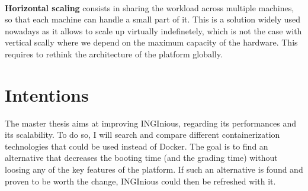 \paragraph{} \textbf{Horizontal scaling} consists in sharing the workload across multiple machines, so that each machine can handle a small part of it.  This is a solution widely used nowadays as it allows to scale up virtually indefinetely, which is not the case with vertical scally where we depend on the maximum capacity of the hardware.  This requires to rethink the architecture of the platform globally.

\section{Intentions}
The master thesis aims at improving INGInious, regarding its performances and its scalability.  To do so, I will search and compare different containerization technologies that could be used instead of Docker.  The goal is to find an alternative that decreases the booting time (and the grading time) without loosing any of the key features of the platform.  If such an alternative is found and proven to be worth the change, INGInious could then be refreshed with it.

